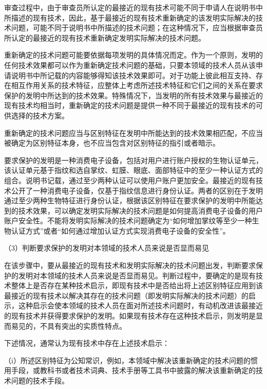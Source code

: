 审查过程中，由于审查员所认定的最接近的现有技术可能不同于申请人在说明书中所描述的现有技术，因此，基于最接近的现有技术重新确定的该发明实际解决的技术问题，可能不同于说明书中所描述的技术问题；在这种情况下，应当根据审查员所认定的最接近的现有技术重新确定发明实际解决的技术问题。

重新确定的技术问题可能要依据每项发明的具体情况而定。作为一个原则，发明的任何技术效果都可以作为重新确定技术问题的基础，只要本领域的技术人员从该申请说明书中所记载的内容能够得知该技术效果即可。对于功能上彼此相互支持、存在相互作用关系的技术特征，应整体上考虑所述技术特征和它们之间的关系在要求保护的发明中所达到的技术效果。特殊情况下，当发明的所有技术效果与最接近的现有技术均相当时，重新确定的技术问题是提供一种不同于最接近的现有技术的可供选择的技术方案。

重新确定的技术问题应当与区别特征在发明中所能达到的技术效果相匹配，不应当被确定为区别特征本身，也不应当包含对区别特征的指引或者暗示。

{\par}

要求保护的发明是一种消费电子设备，包括对用户进行账户授权的生物认证单元，该认证单元基于指纹和选自掌纹、虹膜、眼底、面部特征中的至少一种认证方式的组合。说明书记载，通过至少两种认证可以使用户账户更加安全。最接近的现有技术公开了一种消费电子设备，仅基于指纹信息进行身份认证。两者的区别在于发明通过至少两种生物特征进行身份认证，根据该区别特征在要求保护的发明中所能达到的技术效果，可以确定发明实际解决的技术问题是如何提高消费电子设备的用户账户安全性。不能将发明实际解决的技术问题确定为“如何增加掌纹等至少一种生物认证方式”或者“如何通过增加认证方式实现消费电子设备的安全性”。

{\setlength{\parindent}{17.1bp}（3）判断要求保护的发明对本领域的技术人员来说是否显而易见\par}

在该步骤中，要从最接近的现有技术和发明实际解决的技术问题出发，判断要求保护的发明对本领域的技术人员来说是否显而易见。判断过程中，要确定的是现有技术整体上是否存在某种技术启示，即现有技术中是否给出将上述区别特征应用到该最接近的现有技术以解决其存在的技术问题（即发明实际解决的技术问题）的启示，这种启示会使本领域的技术人员在面对所述技术问题时，有动机改进该最接近的现有技术并获得要求保护的发明。如果现有技术存在这种技术启示，则发明是显而易见的，不具有突出的实质性特点。

下述情况，通常认为现有技术中存在上述技术启示：

{\setlength{\parindent}{17.1bp}（i）所述区别特征为公知常识，例如，本领域中解决该重新确定的技术问题的惯用手段，或教科书或者技术词典、技术手册等工具书中披露的解决该重新确定的技术问题的技术手段。\par}

